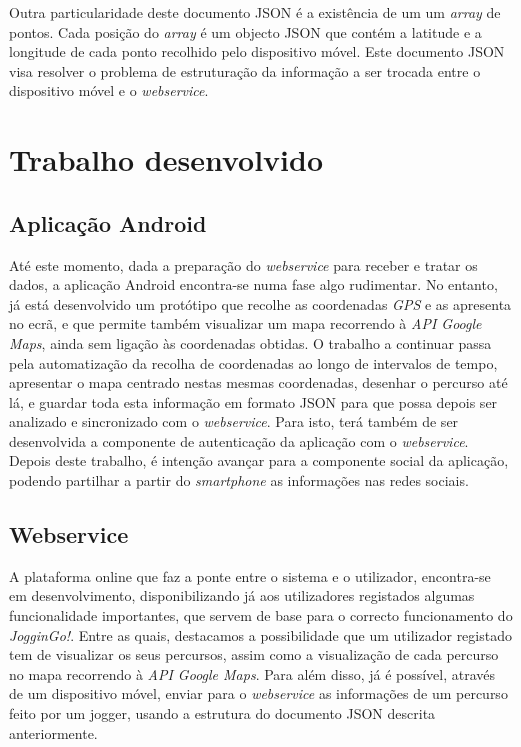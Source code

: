 \documentclass[twocolumn,twoside,10pt,a4paper]{article}
\begin{document}
Outra particularidade deste documento JSON é a existência de um um \textit{array} de pontos. Cada posição do \textit{array} é um objecto JSON que contém a latitude e a longitude de cada ponto recolhido pelo dispositivo móvel.
Este documento JSON visa resolver o problema de estruturação da informação a ser trocada entre o dispositivo móvel e o \textit{webservice}. 

\section{Trabalho desenvolvido}\label{sec:trabalhodesenvolvido}

\subsection{Aplicação Android}

Até este momento, dada a preparação do \textit{webservice} para receber e tratar os dados, a aplicação Android encontra-se numa fase algo rudimentar. No entanto, já está desenvolvido um protótipo que recolhe as coordenadas \textit{GPS} e as apresenta no ecrã, e que permite também visualizar um mapa recorrendo à \emph{API Google Maps}, ainda sem ligação às coordenadas obtidas.
O trabalho a continuar passa pela automatização da recolha de coordenadas ao longo de intervalos de tempo, apresentar o mapa centrado nestas mesmas coordenadas, desenhar o percurso até lá, e guardar toda esta informação em formato JSON para que possa depois ser analizado e sincronizado com o  \textit{webservice}. Para isto, terá também de ser desenvolvida a componente de autenticação da aplicação com o  \textit{webservice}.
Depois deste trabalho, é intenção avançar para a componente social da aplicação, podendo partilhar a partir do  \textit{smartphone} as informações nas redes sociais.

\subsection{Webservice}

A plataforma online que faz a ponte entre o sistema e o utilizador, encontra-se em desenvolvimento, disponibilizando já aos utilizadores registados algumas funcionalidade importantes, que servem de base para o correcto funcionamento do \textit{JogginGo!}. Entre as quais, destacamos a possibilidade que um utilizador registado tem de visualizar os seus percursos, assim como a visualização de cada percurso no mapa  recorrendo à \emph{API Google Maps}. Para além disso, já é possível, através de um dispositivo móvel, enviar para o \textit{webservice} as informações de um percurso feito por um jogger, usando a estrutura do documento JSON descrita anteriormente.
\end{document}
